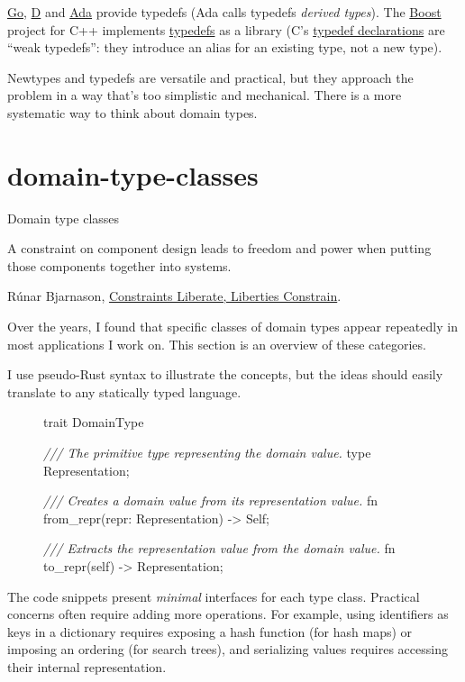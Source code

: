 \documentclass{article}
\begin{document}
\href{https://go.dev/ref/spec#Type_definitions}{Go}, \href{https://dlang.org/library/std/typecons/typedef.html}{D} and \href{https://en.wikibooks.org/wiki/Ada_Programming/Type_System#Derived_types}{Ada} provide typedefs (Ada calls typedefs \emph{derived types}).
The \href{https://www.boost.org/}{Boost} project for C++ implements \href{https://www.boost.org/doc/libs/1_61_0/libs/serialization/doc/strong_typedef.html}{typedefs} as a library
(C's \href{https://en.cppreference.com/w/c/language/typedef}{typedef declarations} are ``weak typedefs'': they introduce an alias for an existing type, not a new type).

Newtypes and typedefs are versatile and practical, but they approach the problem in a way that's too simplistic and mechanical.
There is a more systematic way to think about domain types.

\section{domain-type-classes}{Domain type classes}

\epigraph{A constraint on component design leads to freedom and power when putting those components together into systems.}{
  Rúnar Bjarnason, \href{https://www.youtube.com/watch?v=GqmsQeSzMdw}{Constraints Liberate, Liberties Constrain}.
}

Over the years, I found that specific classes of domain types appear repeatedly in most applications I work on.
This section is an overview of these categories.

I use pseudo-Rust syntax to illustrate the concepts, but the ideas should easily translate to any statically typed language.

\begin{figure}
\begin{code}
trait DomainType {
  \emph{/// The primitive type representing the domain value.}
  type Representation; \label{representation-type}

  \emph{/// Creates a domain value from its representation value.}
  fn from_repr(repr: Representation) -> Self;

  \emph{/// Extracts the representation value from the domain value.}
  fn to_repr(self) -> Representation;
}
\end{code}
\end{figure}

The code snippets present \emph{minimal} interfaces for each type class.
Practical concerns often require adding more operations.
For example, using identifiers as keys in a dictionary requires exposing a hash function (for hash maps) or imposing an ordering (for search trees), and serializing values requires accessing their internal representation.
\end{document}
